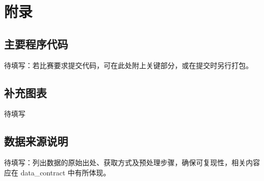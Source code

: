 \section{附录}\label{sec:appendix}

\subsection{主要程序代码}
待填写：若比赛要求提交代码，可在此处附上关键部分，或在提交时另行打包。

\subsection{补充图表}
待填写

\subsection{数据来源说明}
待填写：列出数据的原始出处、获取方式及预处理步骤，确保可复现性，相关内容应在 data_contract 中有所体现。

